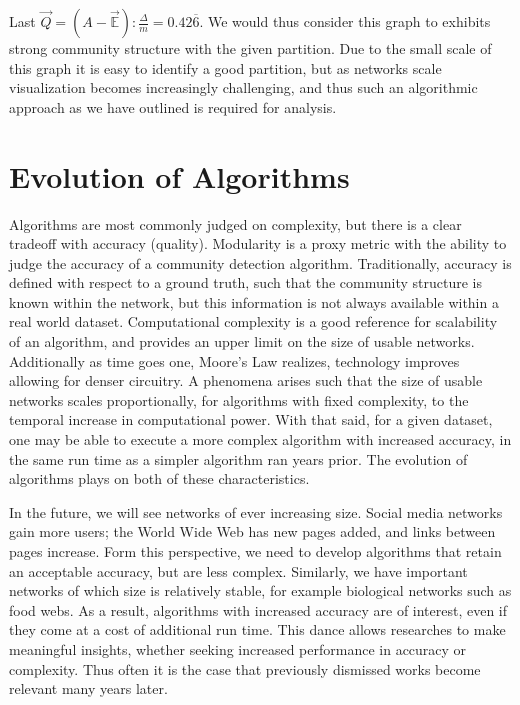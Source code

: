 \documentclass[a4paper, 10pt, twocolumn]{article}
\begin{document}
\noindent
Last $ \vec{Q} = (A - \vec{\mathbb{E}}) : \frac{\varDelta}{m} = 0.42 \overline{6} $.
We would thus consider this graph to exhibits strong community structure with the given partition.
Due to the small scale of this graph it is easy to identify a good partition, but as networks scale visualization becomes increasingly challenging, and thus such an algorithmic approach as we have outlined is required for analysis.


\section{Evolution of Algorithms}

Algorithms are most commonly judged on complexity, but there is a clear tradeoff with accuracy (quality).
Modularity is a proxy metric with the ability to judge the accuracy of a community detection algorithm.
Traditionally, accuracy is defined with respect to a ground truth, such that the community structure is known within the network, but this information is not always available within a real world dataset.
Computational complexity is a good reference for scalability of an algorithm, and provides an upper limit on the size of usable networks.
Additionally as time goes one, Moore's Law realizes, technology improves allowing for denser circuitry.
A phenomena arises such that the size of usable networks scales proportionally, for algorithms with fixed complexity, to the temporal increase in computational power.
With that said, for a given dataset, one may be able to execute a more complex algorithm with increased accuracy, in the same run time as a simpler algorithm ran years prior.
The evolution of algorithms plays on both of these characteristics.

In the future, we will see networks of ever increasing size.
Social media networks gain more users; the World Wide Web has new pages added, and links between pages increase.
Form this perspective, we need to develop algorithms that retain an acceptable accuracy, but are less complex.
Similarly, we have important networks of which size is relatively stable, for example biological networks such as food webs.
As a result, algorithms with increased accuracy are of interest, even if they come at a cost of additional run time.
This dance allows researches to make meaningful insights, whether seeking increased performance in accuracy or complexity.
Thus often it is the case that previously dismissed works become relevant many years later.
\end{document}
